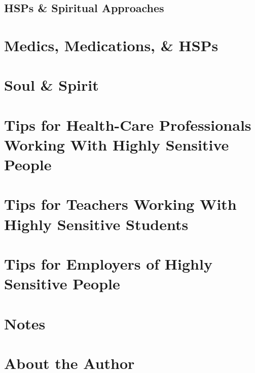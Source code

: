 \documentclass{article}
\numberwithin{equation}{section}
\begin{document}
\subsection{HSPs \& Spiritual Approaches}


\section{Medics, Medications, \& HSPs}


\section{Soul \& Spirit}


\section{Tips for Health-Care Professionals Working With Highly Sensitive People}


\section{Tips for Teachers Working With Highly Sensitive Students}


\section{Tips for Employers of Highly Sensitive People}


\section{Notes}


\section{About the Author}


\printbibliography[heading=bibintoc]
	
\end{document}
